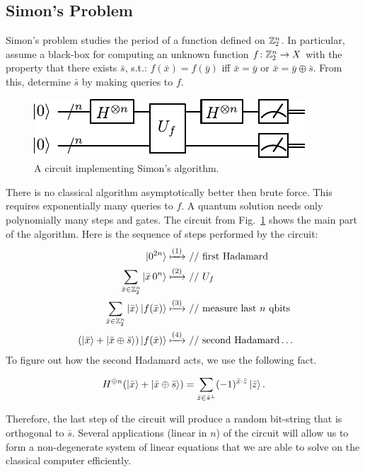 \documentclass{article}
\begin{document}
\subsection{Simon's Problem}

Simon's problem studies the period of a function defined on $\mathbb Z^n_2$.
In particular,
assume a black-box for computing an unknown function $f\colon \mathbb Z^n_2 \to X$ with 
the property that there exists $\bar s$, s.t.: $f(\bar x) = f(\bar y)$ iff 
$\bar x = \bar y$ or $\bar x = \bar y \oplus \bar s$.
From this, determine $\bar s$ by making queries to $f$.

\begin{figure}
    \centering
    \includegraphics[width=0.8\linewidth]{pics/simon.pdf}
    \caption{A circuit implementing Simon's algorithm.}
    \label{fig:simon}
\end{figure}

There is no classical algorithm asymptotically better then brute force. This requires
exponentially many queries to $f$. A quantum solution needs only polynomially many 
steps and gates. The circuit from Fig.~\ref{fig:simon} shows the main part of the algorithm.
Here is the sequence of steps performed by the circuit:
\begin{align*}
      \ket {0^{2n}}
        \xmapsto{(1)} & \text{ // first Hadamard}\\
          \sum_{\bar x \in \mathbb Z^n_2} \ket {\bar x \,0^n}
        \xmapsto{(2)} &\text{ // $U_f$}\\\
          \sum_{\bar x \in \mathbb Z^n_2} 
            \ket {\bar x} \ket{f(\bar x)}
        \xmapsto{(3)} &\text{ // measure last $n$ qbits}\\\
          (\ket {\bar x} + \ket {\bar x \oplus \bar s}) \ket{f(\bar x)}
        \xmapsto{(4)} &\text{ // second Hadamard}\ldots
\end{align*}
To figure out how the second Hadamard acts, we use the following fact. 
\begin{exercise*}
  \[
    H^{\oplus n}(\ket{\bar x} + \ket{\bar x \oplus \bar s}  ) =
      \sum_{\bar z \in {\bar s}^\perp} (-1)^{\bar x \cdot \bar z} \ket{\bar z}.
  \]
\end{exercise*}

Therefore, the last step of the circuit will produce a random bit-string
that is orthogonal to $\bar s$. Several applications (linear in $n$)
 of the circuit will
allow us to form a non-degenerate system of linear equations that we are
able to solve on the classical computer efficiently.

\nocite{rieffel1998introduction} \nocite{arora09computationalcomplexity}
\nocite{kaye07}
\printbibliography
\end{document}
